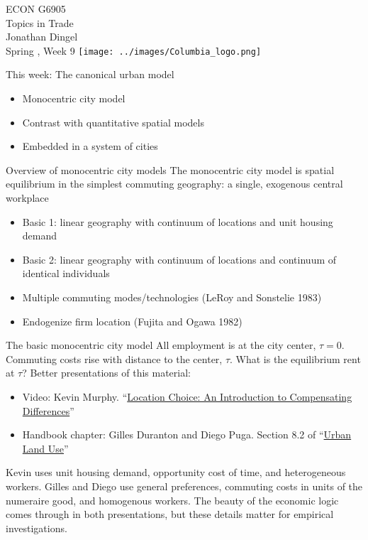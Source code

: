\documentclass[11pt,notes=hide,aspectratio=169]{beamer}
\begin{document}
\begin{frame}[plain]
\begin{center}
\large
\textcolor{columbiadarkblue}{ECON G6905\\
Topics in Trade\\ 
Jonathan Dingel\\
Spring \the\year, Week 9}
\vfill 
\texttt{[image: ../images/Columbia\_logo.png]}
\end{center}
\end{frame}
\begin{frame}{This week: The canonical urban model}
\begin{itemize}
\item Monocentric city model
\item Contrast with quantitative spatial models
\item Embedded in a system of cities
\end{itemize}
\end{frame}
\begin{frame}{Overview of monocentric city models}
The monocentric city model is spatial equilibrium in the simplest commuting geography: a single, exogenous central workplace
\begin{itemize}
\item Basic 1: linear geography with continuum of locations and unit housing demand
\item Basic 2: linear geography with continuum of locations and continuum of identical individuals 
\item Multiple commuting modes/technologies (LeRoy and Sonstelie 1983)
\item Endogenize firm location (Fujita and Ogawa 1982)
\end{itemize}
\end{frame}
\begin{frame}{The basic monocentric city model}
All employment is at the city center, $\tau = 0$.
Commuting costs rise with distance to the center, $\tau$.
What is the equilibrium rent at $\tau$?
Better presentations of this material:
\begin{itemize}
\item Video: Kevin Murphy. ``\href{https://www.youtube.com/playlist?list=PLp2AOdiHSxGeV8AwAwm7nye_2QsQHiC6D}{Location Choice: An Introduction to Compensating Differences}''
\item Handbook chapter: Gilles Duranton and Diego Puga. Section 8.2 of ``\href{https://doi.org/10.1016/B978-0-444-59517-1.00008-8}{Urban Land Use}'' 
\end{itemize}
Kevin uses unit housing demand, opportunity cost of time, and heterogeneous workers.
Gilles and Diego use general preferences, commuting costs in units of the numeraire good, and homogenous workers.
The beauty of the economic logic comes through in both presentations,
but these details matter for empirical investigations.
\end{frame}
\end{document}
